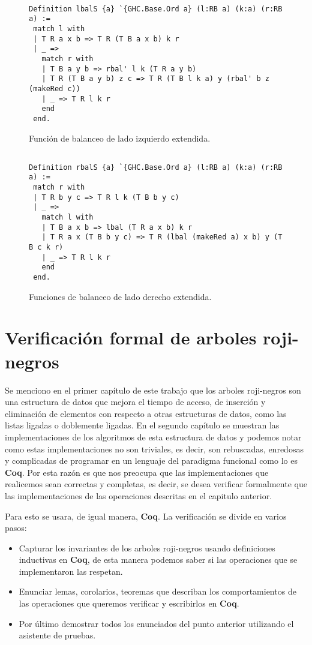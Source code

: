 \documentclass[letterpaper,12pt,oneside]{book}
\newcommand{\coq}{\textbf{Coq}}
\newcommand{\arns}{arboles roji-negros}
\theoremstyle{plain}
\theoremstyle{definition}
\theoremstyle{remark}
\begin{document}
\begin{figure}
\centering 
\captionsetup{justification=centering}
\begin{verbatim}

Definition lbalS {a} `{GHC.Base.Ord a} (l:RB a) (k:a) (r:RB a) :=
 match l with
 | T R a x b => T R (T B a x b) k r
 | _ =>
   match r with
   | T B a y b => rbal' l k (T R a y b)
   | T R (T B a y b) z c => T R (T B l k a) y (rbal' b z (makeRed c))
   | _ => T R l k r 
   end
 end.

\end{verbatim}
\caption{Funci\'on de balanceo de lado izquierdo extendida.}
\end{figure}

\begin{figure}
\centering 
\captionsetup{justification=centering}
\begin{verbatim}

Definition rbalS {a} `{GHC.Base.Ord a} (l:RB a) (k:a) (r:RB a) :=
 match r with
 | T R b y c => T R l k (T B b y c)
 | _ =>
   match l with
   | T B a x b => lbal (T R a x b) k r
   | T R a x (T B b y c) => T R (lbal (makeRed a) x b) y (T B c k r)
   | _ => T R l k r 
   end
 end.

\end{verbatim}
\caption{Funciones de balanceo de lado derecho extendida.}
\end{figure}



\chapter{Verificación formal de {\arns}}
Se menciono en el primer cap\'itulo de este trabajo que los {\arns} son una estructura de datos que mejora el 
tiempo de acceso, de inserción y eliminación de
elementos con respecto a otras estructuras de datos, como las listas ligadas o doblemente ligadas. En el 
segundo cap\'itulo se muestran las implementaciones de los algoritmos de esta  estructura de datos y podemos 
notar como estas implementaciones no son triviales, es decir, son rebuscadas, enredosas y complicadas de 
programar en un lenguaje del paradigma funcional como lo es {\coq}. 
Por esta razón es que nos preocupa que las implementaciones que realicemos sean correctas y completas, es
decir, se desea verificar formalmente que las implementaciones de las operaciones descritas en el 
capitulo anterior.

Para esto se usara, de igual manera, {\coq}. La verificaci\'on se divide en varios pasos:
\begin{itemize}
    \item Capturar los invariantes de los {\arns} usando definiciones inductivas en {\coq}, de esta 
    manera podemos saber si las operaciones que se implementaron las respetan.
    \item Enunciar lemas, corolarios, teoremas que describan los comportamientos de las operaciones que 
    queremos verificar y escribirlos en {\coq}.
    \item Por \'ultimo demostrar todos los enunciados del punto anterior utilizando el asistente de 
    pruebas.
\end{itemize}{}
\end{document}
